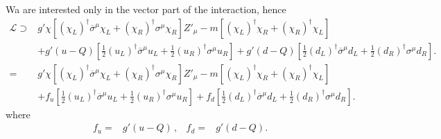 Wa are interested only in the vector part of the interaction, hence
\begin{align}
   \mathcal{L}\supset&g'\chi \left[ \left( \chi_L \right)^{\dagger}  \overline{\sigma}^{\mu}\chi_L+\left( \chi_R \right)^{\dagger} {\sigma}^{\mu}  \chi_R \right]  Z'_{\mu}
           -m \left[\left( \chi_L \right)^{\dagger} \chi_R+
  \left( \chi_R \right)^{\dagger} \chi_L\right] \nonumber\\
  &+g'(u-Q)\left[ \frac{1}{2}\left( u_L \right)^{\dagger}\overline{\sigma}^{\mu} u_L+\frac{1}{2}\left( u_R \right)^{\dagger}{\sigma}^{\mu} u_R  \right]
  +g'(d-Q)\left[ \frac{1}{2}\left( d_L \right)^{\dagger}\overline{\sigma}^{\mu} d_L+\frac{1}{2}\left( d_R \right)^{\dagger}{\sigma}^{\mu} d_R  \right]. \nonumber\\
=& g'\chi \left[ \left( \chi_L \right)^{\dagger}  \overline{\sigma}^{\mu}\chi_L+\left( \chi_R \right)^{\dagger} {\sigma}^{\mu}  \chi_R \right]  Z'_{\mu}
           -m \left[\left( \chi_L \right)^{\dagger} \chi_R+
  \left( \chi_R \right)^{\dagger} \chi_L\right] \nonumber\\
  &+f_u\left[ \frac{1}{2}\left( u_L \right)^{\dagger}\overline{\sigma}^{\mu} u_L+\frac{1}{2}\left( u_R \right)^{\dagger}{\sigma}^{\mu} u_R  \right]
  +f_d\left[ \frac{1}{2}\left( d_L \right)^{\dagger}\overline{\sigma}^{\mu} d_L+\frac{1}{2}\left( d_R \right)^{\dagger}{\sigma}^{\mu} d_R  \right].
\end{align}
where
\begin{align}
  f_u=&g'(u-Q)\,,& f_d=& g'(d-Q).
\end{align}

